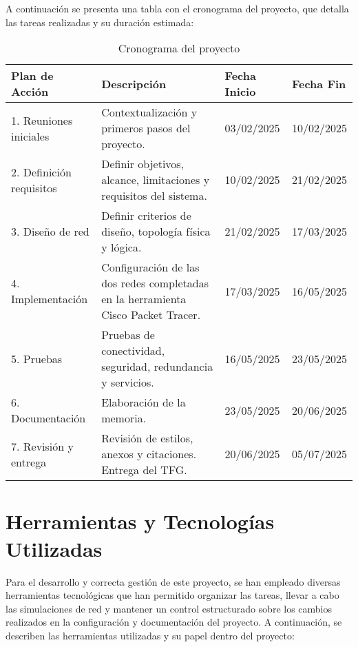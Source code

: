 A continuación se presenta una tabla con el cronograma del proyecto, que detalla las tareas realizadas y su duración estimada:
\renewcommand{\arraystretch}{1.5}
\begin{table}[H]
\centering
\small %
\begin{tabular}{|p{3.5cm}|p{4.9cm}|p{1.8cm}|p{1.8cm}|}
\hline
\textbf{Plan de Acción} & \textbf{Descripción} & \textbf{Fecha Inicio} & \textbf{Fecha Fin} \\ \hline
1. Reuniones iniciales & Contextualización y primeros pasos del proyecto. & 03/02/2025 & 10/02/2025 \\ \hline
2. Definición requisitos & Definir objetivos, alcance, limitaciones y requisitos del sistema. & 10/02/2025 & 21/02/2025 \\ \hline
3. Diseño de red & Definir criterios de diseño, topología física y lógica. & 21/02/2025 & 17/03/2025 \\ \hline
4. Implementación & Configuración de las dos redes completadas en la herramienta Cisco Packet Tracer. & 17/03/2025 & 16/05/2025 \\ \hline
5. Pruebas & Pruebas de conectividad, seguridad, redundancia y servicios. & 16/05/2025 & 23/05/2025 \\ \hline
6. Documentación & Elaboración de la memoria. & 23/05/2025 & 20/06/2025 \\ \hline
7. Revisión y entrega & Revisión de estilos, anexos y citaciones. Entrega del TFG. & 20/06/2025 & 05/07/2025 \\ \hline
\end{tabular}
\caption{Cronograma del proyecto}
\end{table}


\section{Herramientas y Tecnologías Utilizadas}
Para el desarrollo y correcta gestión de este proyecto, se han empleado diversas herramientas tecnológicas que han permitido organizar las tareas, llevar a cabo las 
simulaciones de red y mantener un control estructurado sobre los cambios realizados en la configuración y documentación del proyecto. A continuación, se describen 
las herramientas utilizadas y su papel dentro del proyecto:

